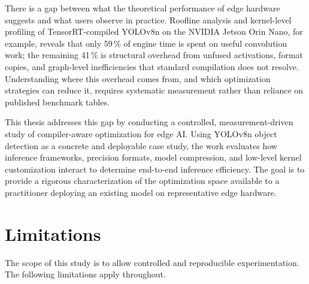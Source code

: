 \documentclass[12pt,a4paper]{report}
\begin{document}
There is a gap between what the theoretical performance of edge hardware suggests and what users observe in
practice.
Roofline analysis and kernel-level profiling of TensorRT-compiled YOLOv8n on the NVIDIA Jetson Orin Nano, for example,
reveals that only 59\,\% of engine time is spent on useful convolution work; the remaining 41\,\% is structural overhead
from unfused activations, format copies, and graph-level inefficiencies that standard compilation does not resolve.
Understanding where this overhead comes from, and which optimization strategies can reduce it, requires systematic
measurement rather than reliance on published benchmark tables.

This thesis addresses this gap by conducting a controlled, measurement-driven study of compiler-aware optimization
for edge AI.
Using YOLOv8n object detection as a concrete and deployable case study, the work evaluates how inference frameworks,
precision formats, model compression, and low-level kernel customization interact to determine end-to-end inference efficiency.
The goal is to provide a rigorous characterization of the optimization
space available to a practitioner deploying an existing model on representative edge hardware.

\section{Limitations}

The scope of this study is to allow controlled and reproducible experimentation.
The following limitations apply throughout.
\end{document}

